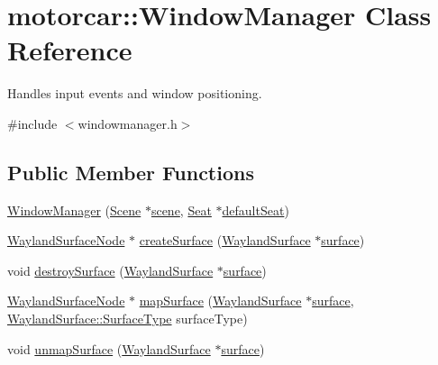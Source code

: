 \hypertarget{classmotorcar_1_1WindowManager}{\section{motorcar\-:\-:Window\-Manager Class Reference}
\label{classmotorcar_1_1WindowManager}
}


Handles input events and window positioning.  




{\ttfamily \#include $<$windowmanager.\-h$>$}

\subsection*{Public Member Functions}
\begin{DoxyCompactItemize}
\item 
\hyperlink{classmotorcar_1_1WindowManager_a72f80d0967d0058275a5de49b79f5388}{Window\-Manager} (\hyperlink{classmotorcar_1_1Scene}{Scene} $\ast$\hyperlink{classmotorcar_1_1WindowManager_a98a3db98b4f0f5a78a7c3d115832be21}{scene}, \hyperlink{classmotorcar_1_1Seat}{Seat} $\ast$\hyperlink{classmotorcar_1_1WindowManager_a5497123fea0679ff61ef3a1cfca11464}{default\-Seat})
\item 
\hyperlink{classmotorcar_1_1WaylandSurfaceNode}{Wayland\-Surface\-Node} $\ast$ \hyperlink{classmotorcar_1_1WindowManager_a3de900878d15a3c161bc74925b115c9f}{create\-Surface} (\hyperlink{classmotorcar_1_1WaylandSurface}{Wayland\-Surface} $\ast$\hyperlink{simple-egl_8cpp_a0720952aa1caded45b5bcdce589663a9}{surface})
\item 
void \hyperlink{classmotorcar_1_1WindowManager_a4a5bd05b1d3ffee2c37fe0c9ebb08ca9}{destroy\-Surface} (\hyperlink{classmotorcar_1_1WaylandSurface}{Wayland\-Surface} $\ast$\hyperlink{simple-egl_8cpp_a0720952aa1caded45b5bcdce589663a9}{surface})
\item 
\hyperlink{classmotorcar_1_1WaylandSurfaceNode}{Wayland\-Surface\-Node} $\ast$ \hyperlink{classmotorcar_1_1WindowManager_afae4e71f7af8d60ffdc6fab320091246}{map\-Surface} (\hyperlink{classmotorcar_1_1WaylandSurface}{Wayland\-Surface} $\ast$\hyperlink{simple-egl_8cpp_a0720952aa1caded45b5bcdce589663a9}{surface}, \hyperlink{classmotorcar_1_1WaylandSurface_a7715a41b6776800656722407ec01e0a5}{Wayland\-Surface\-::\-Surface\-Type} surface\-Type)
\item 
void \hyperlink{classmotorcar_1_1WindowManager_a45035e963a1b1b503f3f8f04ae8c530b}{unmap\-Surface} (\hyperlink{classmotorcar_1_1WaylandSurface}{Wayland\-Surface} $\ast$\hyperlink{simple-egl_8cpp_a0720952aa1caded45b5bcdce589663a9}{surface})

\end{DoxyCompactItemize}
